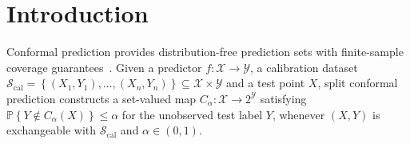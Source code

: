 \documentclass{uai2026} %
\newcommand{\1}{\mathbf{1}}
\newcommand{\prob}{\mathbb{P}}
\newcommand{\xcal}{\mathcal{X}}
\newcommand{\ycal}{\mathcal{Y}}
\newcommand{\scal}{\mathcal{S}}
\newcommand{\ens}[1]{\left\{#1\right\}}
\newcommand{\cali}{\mathrm{cal}}
\newcommand{\scalcal}{\scal_{\cali}}
\begin{document}


 







\section{Introduction}
Conformal prediction provides distribution-free prediction sets with finite-sample coverage guarantees~\citep{vovk2005algorithmic,angelopoulos2024theoretical,shafer2008tutorial}.
Given a predictor $f:\xcal\to\ycal$, a calibration dataset $\scalcal=\ens{(X_1,Y_1),\ldots,(X_n,Y_n)}\subseteq\xcal\times\ycal$ and a test point $X$, split conformal prediction constructs a set-valued map $C_\alpha:\xcal \to 2^{\ycal}$ satisfying $  \prob\ens{Y\not\in C_\alpha(X)}\le \alpha$ for the unobserved test label $Y$, whenever $(X,Y)$ is exchangeable with $\scalcal$ and $\alpha\in(0,1)$.
\end{document}

